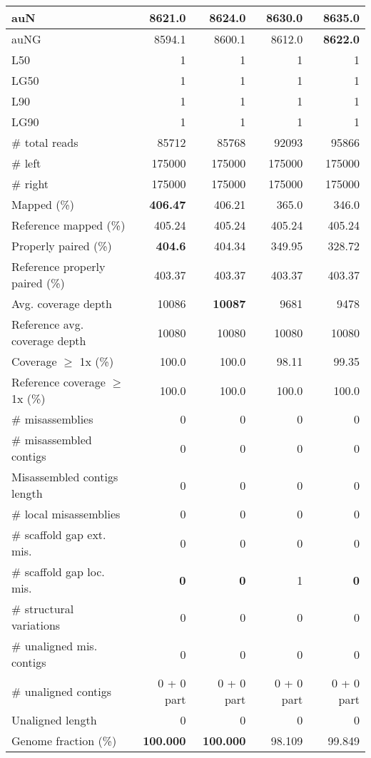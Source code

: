 \documentclass[12pt,a4paper]{article}
\begin{document}
\begin{table}[ht]
\begin{center}
\begin{tabular}{|l*{4}{|r}|}
auN & 8621.0 & 8624.0 & 8630.0 & {\bf 8635.0} \\ \hline
auNG & 8594.1 & 8600.1 & 8612.0 & {\bf 8622.0} \\ \hline
L50 & 1 & 1 & 1 & 1 \\ \hline
LG50 & 1 & 1 & 1 & 1 \\ \hline
L90 & 1 & 1 & 1 & 1 \\ \hline
LG90 & 1 & 1 & 1 & 1 \\ \hline
\# total reads & 85712 & 85768 & 92093 & 95866 \\ \hline
\# left & 175000 & 175000 & 175000 & 175000 \\ \hline
\# right & 175000 & 175000 & 175000 & 175000 \\ \hline
Mapped (\%) & {\bf 406.47} & 406.21 & 365.0 & 346.0 \\ \hline
Reference mapped (\%) & 405.24 & 405.24 & 405.24 & 405.24 \\ \hline
Properly paired (\%) & {\bf 404.6} & 404.34 & 349.95 & 328.72 \\ \hline
Reference properly paired (\%) & 403.37 & 403.37 & 403.37 & 403.37 \\ \hline
Avg. coverage depth & 10086 & {\bf 10087} & 9681 & 9478 \\ \hline
Reference avg. coverage depth & 10080 & 10080 & 10080 & 10080 \\ \hline
Coverage $\geq$ 1x (\%) & 100.0 & 100.0 & 98.11 & 99.35 \\ \hline
Reference coverage $\geq$ 1x (\%) & 100.0 & 100.0 & 100.0 & 100.0 \\ \hline
\# misassemblies & 0 & 0 & 0 & 0 \\ \hline
\# misassembled contigs & 0 & 0 & 0 & 0 \\ \hline
Misassembled contigs length & 0 & 0 & 0 & 0 \\ \hline
\# local misassemblies & 0 & 0 & 0 & 0 \\ \hline
\# scaffold gap ext. mis. & 0 & 0 & 0 & 0 \\ \hline
\# scaffold gap loc. mis. & {\bf 0} & {\bf 0} & 1 & {\bf 0} \\ \hline
\# structural variations & 0 & 0 & 0 & 0 \\ \hline
\# unaligned mis. contigs & 0 & 0 & 0 & 0 \\ \hline
\# unaligned contigs & 0 + 0 part & 0 + 0 part & 0 + 0 part & 0 + 0 part \\ \hline
Unaligned length & 0 & 0 & 0 & 0 \\ \hline
Genome fraction (\%) & {\bf 100.000} & {\bf 100.000} & 98.109 & 99.849 \\ \hline

\end{tabular}
\end{center}
\end{table}
\end{document}
